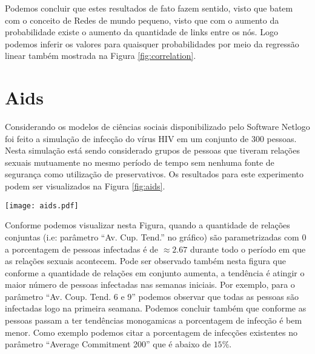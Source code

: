 \documentclass[12pt, letterpaper]{article}
\begin{document}
Podemos concluir que estes resultados de fato fazem sentido, visto que batem com
o conceito de Redes de mundo pequeno, visto que com o aumento da probabilidade
existe o aumento da quantidade de links  entre os nós. Logo podemos inferir os 
valores para quaisquer probabilidades por meio da regressão linear também mostrada
na Figura \ref{fig:correlation}.



\section{Aids}
Considerando os modelos de ciências sociais disponibilizado pelo Software Netlogo
foi feito a simulação de infecção do vírus HIV em um conjunto de 300 pessoas. Nesta
simulação está sendo considerado grupos de pessoas que tiveram relações sexuais
mutuamente no mesmo período de tempo sem nenhuma fonte de segurança como utilização
de preservativos.
Os resultados para este experimento podem ser visualizados na Figura \ref{fig:aids}.

\begin{figure*}
  \centering
  \texttt{[image: aids.pdf]}
  \caption{Simulação do vírus HIV}
  \label{fig:aids}
\end{figure*}

Conforme podemos visualizar nesta Figura, quando a quantidade de relações conjuntas
(i.e: parâmetro ``Av. Cup. Tend.'' no gráfico) são parametrizadas com 0 a porcentagem
de pessoas infectadas é de $\approx 2.67$ durante todo o período em que as relações
sexuais acontecem. Pode ser observado também nesta figura que conforme a quantidade
de relações em conjunto aumenta, a tendência é atingir o maior número de pessoas
infectadas nas semanas iniciais. Por exemplo, para o parâmetro ``Av. Coup. Tend.
6 e 9'' podemos observar que todas as pessoas são infectadas logo na primeira seamana.
Podemos concluir também que conforme as pessoas passam a ter tendências monogamicas
a porcentagem de infecção é bem menor. Como exemplo podemos citar a porcentagem
de infecções existentes no parâmetro ``Average Commitment 200'' que é abaixo
de $15\%$.
\end{document}
